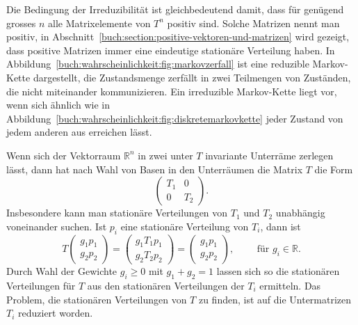 Die Bedingung der Irreduzibilität ist gleichbedeutend damit,
dass für genügend grosses $n$ alle Matrixelemente von $T^n$ positiv sind.
Solche Matrizen nennt man positiv, 
in Abschnitt~\ref{buch:section:positive-vektoren-und-matrizen}
wird gezeigt, dass positive Matrizen immer eine eindeutige
stationäre Verteilung haben.
In Abbildung~\ref{buch:wahrscheinlichkeit:fig:markovzerfall}
ist eine reduzible Markov-Kette dargestellt, die Zustandsmenge
zerfällt in zwei Teilmengen von Zuständen, die nicht miteinander
kommunizieren.
Ein irreduzible Markov-Kette liegt vor, wenn sich ähnlich wie
in Abbildung~\ref{buch:wahrscheinlichkeit:fig:diskretemarkovkette}
jeder Zustand von jedem anderen aus erreichen lässt.

Wenn sich der Vektorraum $\mathbb{R}^n$ in zwei unter $T$ invariante
Unterräme zerlegen lässt, dann hat nach Wahl von Basen in den Unterräumen
die Matrix $T$ die Form
\[
\left(
\begin{array}{c|c}
T_1&0\\
\hline
0&T_2
\end{array}
\right).
\]
Insbesondere kann man stationäre Verteilungen von $T_1$ und $T_2$ 
unabhängig voneinander suchen.
Ist $p_i$ eine stationäre Verteilung von $T_i$, dann ist
\[
T
\left(
\begin{array}{c}
g_1p_1\\
\hline g_2p_2
\end{array}
\right)
=
\left(
\begin{array}{c}
g_1T_1p_1\\
\hline
g_2T_2p_2
\end{array}
\right)
=
\left(
\begin{array}{c}
g_1p_1\\
\hline
g_2p_2
\end{array}
\right),\qquad
\text{ für $g_i\in\mathbb{R}$.}
\]
Durch Wahl der Gewichte $g_i\ge 0$ mit $g_1+g_2=1$ lassen sich so
die stationären Verteilungen für $T$ aus den stationären Verteilungen
der $T_i$ ermitteln.
Das Problem, die stationären Verteilungen von $T$ zu finden, ist
auf die Untermatrizen $T_i$ reduziert worden.


